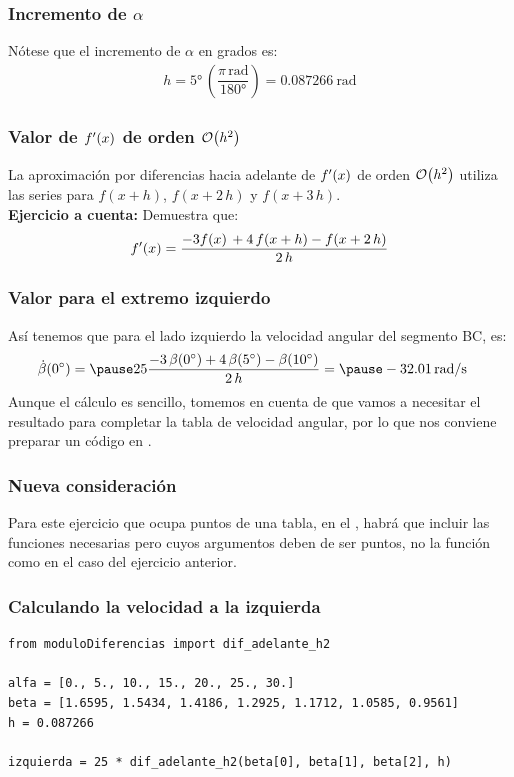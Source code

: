\documentclass[12pt]{beamer}
\begin{document}
\begin{frame}
\frametitle{Incremento de $\alpha$}
Nótese que el incremento de $\alpha$ en grados es:
\pause
\begin{align*}
h = \ang{5} \, \left( \dfrac{\pi \, \unit{\radian}}{\ang{180}} \right) = \SI{0.087266}{\radian}
\end{align*}
\end{frame}
\begin{frame}
\frametitle{Valor de ${f}^{\prime} (x)$ de orden $\order{h^{2}}$}
La aproximación por diferencias hacia adelante de ${f}^{\prime} (x)$ de orden $\order{h^{2}}$ utiliza las series para $f (x + h)$, $f (x + 2 \, h)$ y $f (x + 3 \, h)$.
\\
\bigskip
\pause
\textbf{Ejercicio a cuenta:} Demuestra que:
\begin{align*}
{f}^{\prime} (x) = \dfrac{- 3 f (x) \, + 4 \, f (x + h) - f (x + 2 \, h)}{2 \, h}
\end{align*}
\end{frame}
\begin{frame}
\frametitle{Valor para el extremo izquierdo}
Así tenemos que para el lado izquierdo la velocidad angular del segmento BC, es: 
\pause
\begin{eqnarray*}
\begin{aligned}
\dot{\beta}(\ang{0}) &=  \pause 25 \dfrac{- 3 \, \beta(\ang{0}) + 4 \, \beta(\ang{5}) - \beta(\ang{10})}{2 \, h} = \pause \SI[per-mode=symbol]{-32.01}{\radian\per\second}
\end{aligned}
\end{eqnarray*}
\pause
Aunque el cálculo es sencillo, tomemos en cuenta de que vamos a necesitar el resultado para completar la tabla de velocidad angular, por lo que nos conviene preparar un código en \python.
\end{frame}
\begin{frame}
\frametitle{Nueva consideración}
Para este ejercicio que ocupa puntos de una tabla, en el , habrá que incluir las funciones necesarias pero cuyos argumentos deben de ser puntos, no la función como en el caso del ejercicio anterior.
\end{frame}
\begin{frame}[fragile]
\frametitle{Calculando la velocidad a la izquierda}
\begin{lstlisting}[caption=Código para calcular la velocidad angular en el extremo izquierdo]
from moduloDiferencias import dif_adelante_h2

alfa = [0., 5., 10., 15., 20., 25., 30.]
beta = [1.6595, 1.5434, 1.4186, 1.2925, 1.1712, 1.0585, 0.9561]
h = 0.087266

izquierda = 25 * dif_adelante_h2(beta[0], beta[1], beta[2], h)
\end{lstlisting}
\end{frame}
\end{document}
